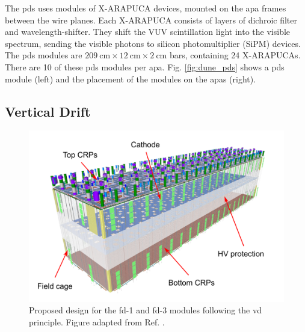 The \gls{pds} uses modules of X-ARAPUCA devices, mounted on the \gls{apa} frames between the wire planes. Each X-ARAPUCA consists of layers of dichroic filter and wavelength-shifter. They shift the VUV scintillation light into the visible spectrum, sending the visible photons to silicon photomultiplier (SiPM) devices. The \gls{pds} modules are $209~\mathrm{cm}\times12~\mathrm{cm}\times2~\mathrm{cm}$ bars, containing 24 X-ARAPUCAs. There are 10 of these \gls{pds} modules per \gls{apa}. Fig. \ref{fig:dune_pds} shows a \gls{pds} module (left) and the placement of the modules on the \gls{apa}s (right).

\subsection{Vertical Drift}

\begin{figure}[t]
	\centering
	\includegraphics[width=0.70\linewidth]{Images/DUNE/FD/dune_vd}
	\caption[Proposed design for the \gls{fd}-1 and \gls{fd}-3 modules following the \gls{vd} principle.]{Proposed design for the \gls{fd}-1 and \gls{fd}-3 modules following the \gls{vd} principle. Figure adapted from Ref. \cite{DUNEVDTDR}.}
	\label{fig:dune_vd}
\end{figure}

